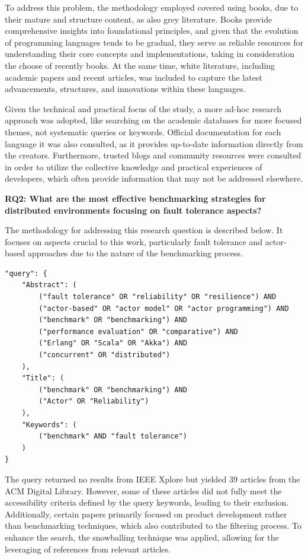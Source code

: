 To address this problem, the methodology employed covered using books, due to their mature and structure content, as also grey literature. Books provide comprehensive insights into foundational principles, and given that the evolution of programming languages tends to be gradual, they serve as reliable resources for understanding their core concepts and implementations, taking in consideration the choose of recently books. At the same time, white literature, including academic papers and recent articles, was included to capture the latest advancements, structures, and innovations within these languages.

Given the technical and practical focus of the study, a more ad-hoc research approach was adopted, like searching on the academic databases for more focused themes, not systematic queries or keywords. Official documentation for each language it was also consulted, as it provides up-to-date information directly from the creators. Furthermore, trusted blogs and community resources were consulted in order to utilize the collective knowledge and practical experiences of developers, which often provide information that may not be addressed elsewhere.

\textbf{RQ2: What are the most effective benchmarking strategies for distributed environments focusing on fault tolerance aspects?}

The methodology for addressing this research question is described below. It focuses on aspects crucial to this work, particularly fault tolerance and actor-based approaches due to the nature of the benchmarking process.

\begin{verbatim}
"query": {
    "Abstract": (
        ("fault tolerance" OR "reliability" OR "resilience") AND 
        ("actor-based" OR "actor model" OR "actor programming") AND 
        ("benchmark" OR "benchmarking") AND 
        ("performance evaluation" OR "comparative") AND 
        ("Erlang" OR "Scala" OR "Akka") AND 
        ("concurrent" OR "distributed")
    ),
    "Title": (
        ("benchmark" OR "benchmarking") AND 
        ("Actor" OR "Reliability")
    ),
    "Keywords": (
        ("benchmark" AND "fault tolerance")
    )
}
\end{verbatim}

The query returned no results from IEEE Xplore but yielded 39 articles from the ACM Digital Library. However, some of these articles did not fully meet the accessibility criteria defined by the query keywords, leading to their exclusion. Additionally, certain papers primarily focused on product development rather than benchmarking techniques, which also contributed to the filtering process. To enhance the search, the snowballing technique was applied, allowing for the leveraging of references from relevant articles.

